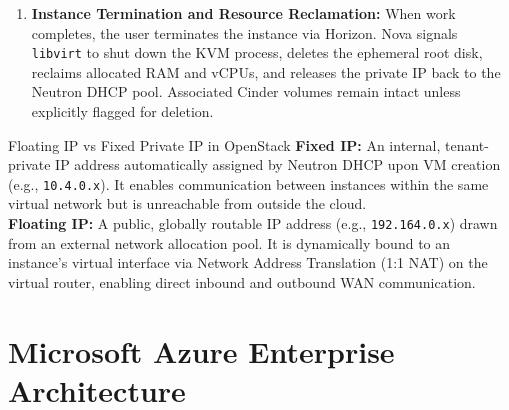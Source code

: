 \begin{enumerate}[leftmargin=*]
    \begin{itemize}
      \item \emph{Command Line Access:} Direct terminal connection via secure shell:
      \begin{lstlisting}[language=bash]
ssh -i ~/.ssh/meghamala_key.pem ubuntu@192.164.0.8
      \end{lstlisting}
      \item \emph{Graphical Desktop Access via X2Go:} X2Go is an open-source remote desktop client based on NX technology, allowing high-performance graphical desktop access over low-bandwidth wide-area connections. The user configures an X2Go session targeting host \texttt{192.164.0.8}, specifying user \texttt{ubuntu}, RSA private key authentication, and session environment (e.g., XFCE or MATE).
    \end{itemize}
  \item \textbf{Instance Termination and Resource Reclamation:} When work completes, the user terminates the instance via Horizon. Nova signals \texttt{libvirt} to shut down the KVM process, deletes the ephemeral root disk, reclaims allocated RAM and vCPUs, and releases the private IP back to the Neutron DHCP pool. Associated Cinder volumes remain intact unless explicitly flagged for deletion.
\end{enumerate}

\begin{defbox}{Floating IP vs Fixed Private IP in OpenStack}
\textbf{Fixed IP:} An internal, tenant-private IP address automatically assigned by Neutron DHCP upon VM creation (e.g., \texttt{10.4.0.x}). It enables communication between instances within the same virtual network but is unreachable from outside the cloud.\\
\textbf{Floating IP:} A public, globally routable IP address (e.g., \texttt{192.164.0.x}) drawn from an external network allocation pool. It is dynamically bound to an instance's virtual interface via Network Address Translation (1:1 NAT) on the virtual router, enabling direct inbound and outbound WAN communication.
\end{defbox}

\section{Microsoft Azure Enterprise Architecture}
